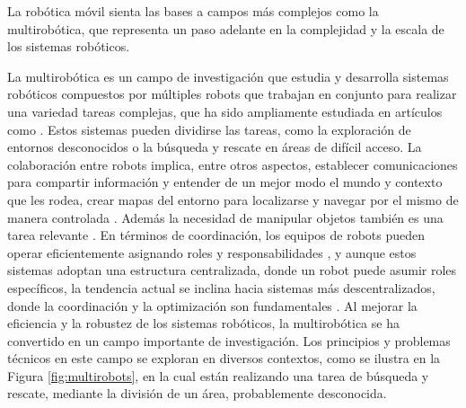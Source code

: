 La robótica móvil sienta las bases a campos más complejos como la multirobótica,
que representa un paso adelante en la complejidad y la escala de los sistemas
robóticos.


La multirobótica es un campo de investigación que estudia y desarrolla sistemas
robóticos compuestos por múltiples robots que trabajan en conjunto para realizar
una variedad tareas complejas, que ha sido ampliamente estudiada en artículos
como \cite{Verma2021}.
Estos sistemas pueden dividirse las tareas, como la exploración de entornos
desconocidos o la búsqueda y rescate en áreas de difícil acceso.
La colaboración entre robots implica, entre otros aspectos, establecer
comunicaciones para compartir información y entender de un mejor modo el mundo y
contexto que les rodea, crear mapas del entorno para localizarse y navegar por
el mismo de manera controlada \cite{Trawny2009, Fox2000}.
Además la necesidad de manipular objetos también es una tarea relevante
\cite{Parker2003}.
En términos de coordinación, los equipos de robots pueden operar eficientemente
asignando roles y responsabilidades \cite{Alami1998}, y aunque estos sistemas
adoptan una estructura centralizada, donde un robot puede asumir roles
específicos, la tendencia actual se inclina hacia sistemas más descentralizados,
donde la coordinación y la optimización son fundamentales \cite{Sheng2006}.
Al mejorar la eficiencia y la robustez de los sistemas robóticos, la
multirobótica se ha convertido en un campo importante de investigación.
Los principios y problemas técnicos en este campo se exploran en diversos
contextos, como se ilustra en la Figura \ref{fig:multirobots}, en la cual están
realizando una tarea de búsqueda y rescate, mediante la división de un área,
probablemente desconocida.


